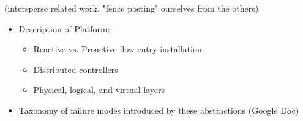 (intersperse related work, "fence posting" ourselves from the others)

\begin{itemize}
\item Description of Platform: 
\begin{itemize}
   \item Reactive vs. Proactive flow entry installation
   \item Distributed controllers
   \item Physical, logical, and virtual layers
\end{itemize}
\item Taxonomy of failure modes introduced by these abstractions (Google Doc)

\end{itemize}
